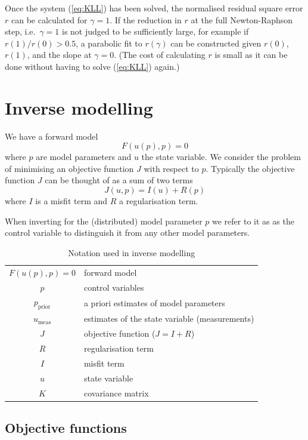 \documentclass[10pt,a4paper]{book}
\begin{document}
Once the system (\ref{eq:KLL}) has been solved, the normalised
residual square error $r$ can be calculated for $\gamma=1$.  If the
reduction in $r$ at the full Newton-Raphson step, i.e.\ $\gamma=1$ is
not judged to be sufficiently large, for example if $r(1)/r(0)>0.5$, a
parabolic fit to $r(\gamma)$ can be constructed given $r(0)$, $r(1)$,
and the slope at $\gamma=0$. (The cost of calculating $r$ is small as
it can be done without having to solve (\ref{eq:KLL}) again.) 

\chapter{Inverse modelling}

We have a forward model
\[
F(u(p),p)=0
\]
where $p$ are model parameters and $u$ the state variable. We consider
the problem of minimising an objective function $J$ with respect to
$p$. Typically the objective function $J$ can be thought of as a sum of two terms
\[
 J(u,p)=I(u)+R(p)
\] 
where $I$ is a misfit term and $R$ a regularisation term. 

When inverting for the (distributed) model parameter $p$ we refer to it as as the
control variable to distinguish it from any other model parameters.

\begin{table}[tb]
\caption{\label{tab:inv} Notation used in inverse modelling}
\begin{center}
\begin{tabular}{cl}
\hline
$F(u(p),p)=0$ & forward model \\
$p$ & control variables \\
$p_{\mathrm{prior}}$  & a priori estimates of model parameters\\
$u_{\mathrm{meas}}$ & estimates of the state variable (measurements) \\  
$J$ & objective function ($J=I+R$)\\
$R$ & regularisation term\\
$I$ & misfit term\\
$u$ & state variable\\
$K$ & covariance matrix \\
\hline
\end{tabular}
\end{center}
\end{table}


\section{Objective functions}
\end{document}
